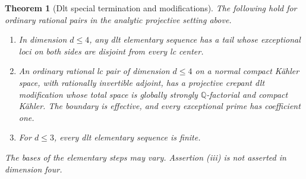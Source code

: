 \documentclass[11pt,letterpaper]{article}
\newcommand{\Q}{\mathbb{Q}}
\newtheorem{theorem}{Theorem}[section]
\theoremstyle{definition}
\theoremstyle{remark}
\begin{document}
\begin{theorem}[Dlt special termination and modifications]
\label{bir:special-termination}
The following hold for ordinary rational pairs in the analytic
projective setting above.
\begin{enumerate}[label=\textup{(\roman*)}]
\item In dimension $d\leq4$, any dlt elementary sequence has a tail
whose exceptional loci on both sides are disjoint from every lc
center.
\item An ordinary rational lc pair of dimension $d\leq4$ on a
normal compact K\"ahler space, with rationally invertible adjoint,
has a projective crepant dlt modification whose total space is
globally strongly $\Q$-factorial and compact K\"ahler.  The boundary
is effective, and every exceptional prime has coefficient one.
\item For $d\leq3$, every dlt elementary sequence is finite.
\end{enumerate}
The bases of the elementary steps may vary.  Assertion \textup{(iii)}
is not asserted in dimension four.
\end{theorem}
\end{document}
